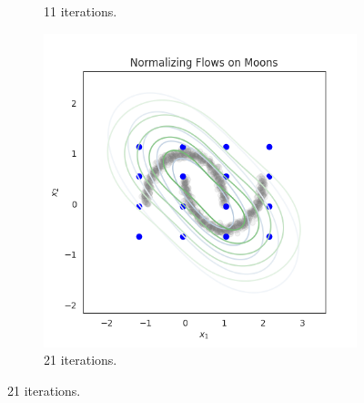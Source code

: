 \documentclass[shortabstract]{iithesis}
\begin{document}
\begin{figure}
\begin{subfigure}{0.32\textwidth}
    \caption{ 11 iterations.}
    \end{subfigure}
    \begin{subfigure}{0.32\textwidth}
    \includegraphics[scale=0.35]{flow_on_moons_2_penalty=0_grid.png}
    \caption{ 21 iterations.}
    \end{subfigure}
    

\end{figure}
\end{document}
